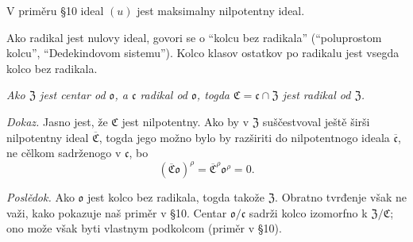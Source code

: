 \documentclass[11pt]{article}
\providecommand{\mc}{\mathfrak{c}}
\providecommand{\mC}{\mathfrak{C}}
\providecommand{\mZ}{\mathfrak{Z}}
\providecommand{\mo}{\mathfrak{o}}
\begin{document}
V priměru §10 ideal $(u)$ jest maksimalny nilpotentny ideal.

Ako radikal jest nulovy ideal, govori se o “kolcu bez radikala” (“poluprostom kolcu”, “Dedekindovom sistemu”). Kolco klasov ostatkov po radikalu jest vsegda kolco bez radikala.

\emph{Ako $\mZ$ jest centar od $\mo$, a $\mc$ radikal od $\mo$, togda $\mC=\mc\cap\mZ$ jest radikal od $\mZ$.}

\emph{Dokaz.} Jasno jest, že $\mC$ jest nilpotentny. Ako by v $\mZ$ suščestvoval ještě širši nilpotentny ideal $\overline{\mC}$, togda jego možno bylo by razširiti do nilpotentnogo ideala $\overline{\mc}$, ne cělkom sadrženogo v $\mc$, bo
\[
        (\overline{\mC}\mo)^\rho=\overline{\mC}^{\rho}\mo^\rho=0.
\]

\emph{Poslědok.} Ako $\mo$ jest kolco bez radikala, togda takože $\mZ$. Obratno tvrđenje však ne važi, kako pokazuje naš priměr v §10. Centar $\mo/\mc$ sadrži kolco izomorfno k $\mZ/\mC$; ono može však byti vlastnym podkolcom (priměr v §10).
\end{document}
